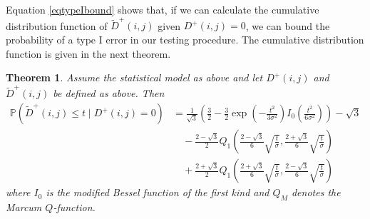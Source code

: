 \documentclass[a4paper,12pt]{article}
\theoremstyle{plain}
\newtheorem{theorem}{Theorem}[section]
\theoremstyle{definition}
\theoremstyle{remark}
\begin{document}
Equation \eqref{eqtypeIbound} shows that, if we can calculate the cumulative distribution function of $\tilde{D}^+(i, j)$ given $D^+(i, j) = 0$, we can bound the probability of a type I error in our testing procedure. The cumulative distribution function is given in the next theorem.
\begin{theorem}\label{thmeqcdf}
	Assume the statistical model as above and let $D^+(i, j)$ and $\tilde{D}^+(i, j)$ be defined as above. Then
	\begin{equation}\label{eqcdf}
		\begin{aligned}
			\mathbb{P}(\tilde{D}^+(i, j) \leq t \mid D^+(i, j) = 0) &= \frac{1}{\sqrt{3}} \left( \frac{3}{2} - \frac{3}{2} \exp \left( - \frac{t^2}{3 \sigma^2} \right) I_0 \left( \frac{t^2}{6 \sigma^2} \right) \right) - \sqrt{3} \\
			&\quad - \frac{2 - \sqrt{3}}{2} Q_1 \left( \frac{2 - \sqrt{3}}{6} \sqrt{\frac{t}{\sigma}}, \frac{2 + \sqrt{3}}{6} \sqrt{\frac{t}{\sigma}} \right) \\
			&\quad + \frac{2 + \sqrt{3}}{2} Q_1 \left( \frac{2 + \sqrt{3}}{6} \sqrt{\frac{t}{\sigma}}, \frac{2 - \sqrt{3}}{6} \sqrt{\frac{t}{\sigma}} \right)
		\end{aligned}
	\end{equation}
	where $I_0$ is the modified Bessel function of the first kind and $Q_M$ denotes the Marcum $Q$-function.
\end{theorem}
\end{document}
